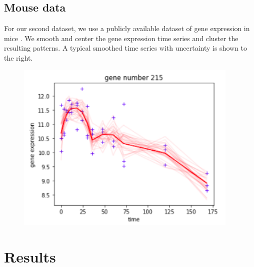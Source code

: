 \documentclass[a0,plainsections,30pt]{sciposter}\usepackage[]{graphicx}\usepackage[]{color}
\newenvironment{knitrout}{}{} %
\begin{document}
\begin{minipage}[t]{0.45\textwidth}
\begin{minipage}[t]{0.49\textwidth}
\begin{knitrout}
{}



\end{knitrout}
\end{minipage}
%

\vspace{1em}

\begin{minipage}[t]{0.49\textwidth}
%
\subsection*{Mouse data} For our second dataset, we use a publicly available
dataset of gene expression in mice \citep{shoemaker:2015:ultrasensitive} . We
smooth and center the gene expression time series and cluster the resulting
patterns.  A typical smoothed time series with uncertainty is shown to the
right.
%
\end{minipage}
%
\begin{minipage}[t]{0.49\textwidth}
\begin{figure}[!h]
\centering
\includegraphics[width = 0.95\textwidth]{./static_images/mouse_genes.png}
\end{figure}
\end{minipage}
%

\vspace{-0.6in}
\section*{Results}
\vspace{-0.3in}


\end{minipage}
\end{document}
